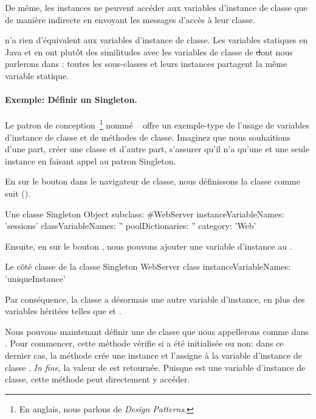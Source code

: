 \documentclass[a4paper,10pt,twoside]{book}
\begin{document}
De même, les instances ne peuvent accéder aux variables d'instance de classe
que de manière indirecte en envoyant les messages d'accès à leur classe.

 n'a rien d'équivalent aux variables d'instance de classe.  
Les variables statiques en Java et en  ont plutôt des similitudes 
avec les variables de classe de \st dont nous parlerons dans : toutes les sous-classes et leurs instances partagent la même variable statique.

\paragraph{Exemple: Définir un Singleton.}
Le patron de conception~\footnote{En anglais, nous parlons de \emph{Design Patterns}.} nommé ~\cite{Alpe98a} offre un exemple-type de l'usage de variables d'instance de classe et de méthodes de classe.
Imaginez que nous souhaitions d'une part, créer une classe  et d'autre part, s'assurer qu'il n'a qu'une et une seule instance en faisant appel au patron Singleton.

En \clickant{} sur le bouton  dans le navigateur de classe, nous définissons la classe  comme suit ().

\begin{classdef}[singleton]{Une classe Singleton}
Object subclass: #WebServer
	instanceVariableNames: 'sessions' 	
	classVariableNames: '' 	
	poolDictionaries: ''
	category: 'Web'
\end{classdef}

Ensuite, en \clickant{} sur le bouton , nous pouvons ajouter une variable d'instance  au .

\begin{classdef}[webserver]{Le côté classe de la classe Singleton}
WebServer class 	
	instanceVariableNames: 'uniqueInstance'
\end{classdef}

Par conséquence, la classe  a désormais une autre variable d'instance, en plus des variables héritées telles que  et .

Nous pouvons maintenant définir une  de classe que nous appellerons  comme dans . 
Pour commencer, cette méthode vérifie si  a été initialisée ou non: dans ce dernier cas,
la méthode crée une instance et l'assigne à la variable d'instance de classe .  
\emph{In fine}, la valeur de  est retournée.
Puisque  est une variable d'instance de classe, cette méthode peut directement y accéder.
\end{document}

